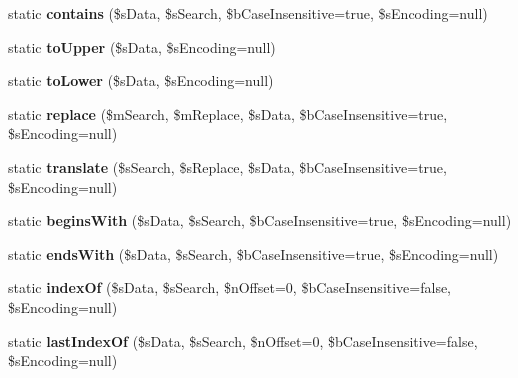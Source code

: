 \begin{DoxyCompactItemize}
\item 
\hypertarget{class_encoding_a0cb02b0f21b8d02c9f61e0b4dc40b91e}{static {\bfseries contains} (\$s\-Data, \$s\-Search, \$b\-Case\-Insensitive=true, \$s\-Encoding=null)}\label{class_encoding_a0cb02b0f21b8d02c9f61e0b4dc40b91e}

\item 
\hypertarget{class_encoding_afc0d58dff99b7ab3d262e8541d976f96}{static {\bfseries to\-Upper} (\$s\-Data, \$s\-Encoding=null)}\label{class_encoding_afc0d58dff99b7ab3d262e8541d976f96}

\item 
\hypertarget{class_encoding_a9062e324d2c6b56be9015bebbd712f97}{static {\bfseries to\-Lower} (\$s\-Data, \$s\-Encoding=null)}\label{class_encoding_a9062e324d2c6b56be9015bebbd712f97}

\item 
\hypertarget{class_encoding_a1fb93efe3dfed90b649fa287d24f19d4}{static {\bfseries replace} (\$m\-Search, \$m\-Replace, \$s\-Data, \$b\-Case\-Insensitive=true, \$s\-Encoding=null)}\label{class_encoding_a1fb93efe3dfed90b649fa287d24f19d4}

\item 
\hypertarget{class_encoding_a917ed7904940f66fa6f55dbbcd5045d6}{static {\bfseries translate} (\$s\-Search, \$s\-Replace, \$s\-Data, \$b\-Case\-Insensitive=true, \$s\-Encoding=null)}\label{class_encoding_a917ed7904940f66fa6f55dbbcd5045d6}

\item 
\hypertarget{class_encoding_a78bafc7d0277586de70dd96d35848b7b}{static {\bfseries begins\-With} (\$s\-Data, \$s\-Search, \$b\-Case\-Insensitive=true, \$s\-Encoding=null)}\label{class_encoding_a78bafc7d0277586de70dd96d35848b7b}

\item 
\hypertarget{class_encoding_ac974851ec9c759ec48c4d7cfc3a02af3}{static {\bfseries ends\-With} (\$s\-Data, \$s\-Search, \$b\-Case\-Insensitive=true, \$s\-Encoding=null)}\label{class_encoding_ac974851ec9c759ec48c4d7cfc3a02af3}

\item 
\hypertarget{class_encoding_ade0abddcb099687889a907937aee3032}{static {\bfseries index\-Of} (\$s\-Data, \$s\-Search, \$n\-Offset=0, \$b\-Case\-Insensitive=false, \$s\-Encoding=null)}\label{class_encoding_ade0abddcb099687889a907937aee3032}

\item 
\hypertarget{class_encoding_aee6f17f2cd5ddfa73041dcb8ae563ae7}{static {\bfseries last\-Index\-Of} (\$s\-Data, \$s\-Search, \$n\-Offset=0, \$b\-Case\-Insensitive=false, \$s\-Encoding=null)}\label{class_encoding_aee6f17f2cd5ddfa73041dcb8ae563ae7}


\end{DoxyCompactItemize}
